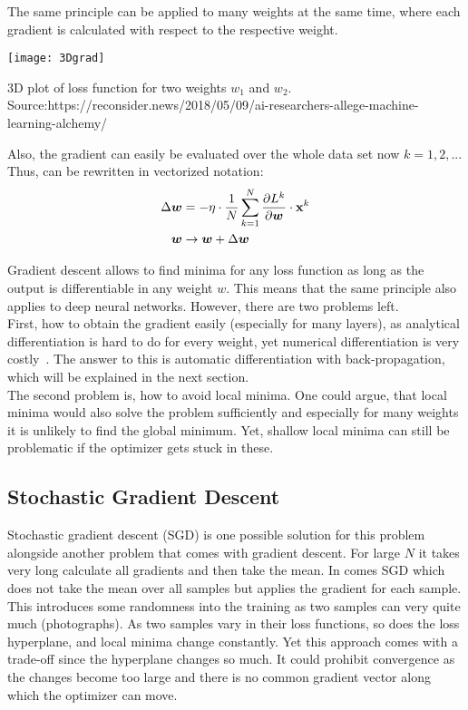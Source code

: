 The same principle can be applied to many weights at the same time, where each gradient is calculated with respect to the respective weight.
\begin{marginfigure}
    \texttt{[image: 3Dgrad]}
    \caption[]{3D plot of loss function for two  weights $w_1$ and $w_2$. Source:{https://reconsider.news/2018/05/09/ai-researchers-allege-machine-learning-alchemy/}}
\end{marginfigure}
Also, the gradient can easily be evaluated over the whole data set now $k = 1, 2,...$
Thus,  can be rewritten in vectorized notation:
\begin{align}
    \Delta \boldsymbol{w} & = - \eta \cdot \frac{1}{N} \sum_{k=1}^{N} \frac{\partial L^k}{\partial \boldsymbol{w}} \cdot \mathbf{x}^k \\
    \boldsymbol{w} & \rightarrow \boldsymbol{w} + \Delta \boldsymbol{w}
\end{align}

Gradient descent allows to find minima for any loss function as long as the output is differentiable in any weight $w$.
This means that the same principle also applies to deep neural networks.
However, there are two problems left.\\
First, how to obtain the gradient easily (especially for many layers), as analytical differentiation is hard to do for every weight, yet numerical differentiation is very costly~\cite{ommer}.
The answer to this is automatic differentiation with back-propagation, which will be explained in the next section.\\
The second problem is, how to avoid local minima.
One could argue, that local minima would also solve the problem sufficiently and especially for many weights it is unlikely to find the global minimum.
Yet, shallow local minima can still be problematic if the optimizer gets stuck in these.

\subsection{Stochastic Gradient Descent}
Stochastic gradient descent (SGD) is one possible solution for this problem alongside another problem that comes with gradient descent.
For large $N$ it takes very long calculate all gradients and then take the mean.
In comes SGD which does not take the mean over all samples but applies the gradient for each sample.\\
This introduces some randomness into the training as two samples can very quite much (\eg photographs).
As two samples vary in their loss functions, so does the loss hyperplane, and local minima change constantly.
Yet this approach comes with a trade-off since the hyperplane changes so much.
It could prohibit convergence as the changes become too large and there is no common gradient vector along which the optimizer can move.


